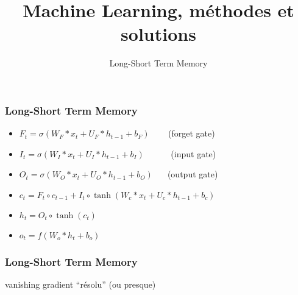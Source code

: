 \documentclass{formation}
\title{Machine Learning, méthodes et solutions}
\subtitle{Long-Short Term Memory}
\begin{document}
\maketitle

\begin{frame}
  \frametitle{Long-Short Term Memory}
  \begin{itemize}
  \item $F_{t}=\sigma (W_{F}*x_{t}+U_{F}*h_{t-1}+b_{F})\;\;\;\;\;\;\,$ (forget gate)
  \item $I_{t} =\sigma (W_{I}*x_{t}+U_{I}*h_{t-1}+b_{I})\;\;\;\;\;\;\;\;\;\;$ (input gate)
  \item $O_{t} =\sigma (W_{O}*x_{t}+U_{O}*h_{t-1}+b_{O})\;\;\;\;\;$ (output gate)
  \item $c_{t} =F_{t}\circ c_{t-1}+I_{t}\circ \tanh(W_{c}*x_{t}+U_{c}*h_{t-1}+b_{c})$
  \item $h_{t} =O_{t}\circ \tanh(c_{t})$
  \item $o_{t} =f(W_{o}*h_{t}+b_{o})$
  \end{itemize}
\end{frame}

\begin{frame}
  \frametitle{Long-Short Term Memory}
  vanishing gradient ``résolu'' (ou presque)
\end{frame}
\end{document}
